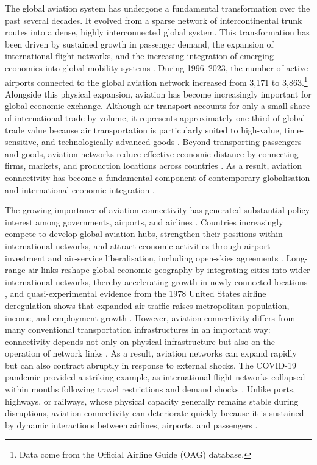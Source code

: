 The global aviation system has undergone a fundamental transformation over
the past several decades. It evolved from a sparse network of
intercontinental trunk routes into a dense, highly interconnected global
system. This transformation has been driven by sustained growth in passenger
demand, the expansion of international flight networks, and the increasing
integration of emerging economies into global mobility systems
\citep{Liao_2026,OKelly_2026}. During 1996--2023, the number of active
airports connected to the global aviation network increased from 3{,}171 to
3{,}863.\footnote{Data come from the Official Airline Guide (OAG) database.}
Alongside this physical expansion, aviation has become increasingly important
for global economic exchange. Although air transport accounts for only a
small share of international trade by volume, it represents approximately one
third of global trade value because air transportation is particularly suited
to high-value, time-sensitive, and technologically advanced goods
\citep{IATA_cargo}. Beyond transporting passengers and goods, aviation
networks reduce effective economic distance by connecting firms, markets, and
production locations across countries \citep{Lenaerts_2021}. As a result,
aviation connectivity has become a fundamental component of contemporary
globalisation and international economic integration \citep{Zhang_2026}.

The growing importance of aviation connectivity has generated substantial
policy interest among governments, airports, and airlines \citep{Adler_2014}.
Countries increasingly compete to develop global aviation hubs, strengthen
their positions within international networks, and attract economic
activities through airport investment and air-service liberalisation,
including open-skies agreements \citep{Gillen_2002,Burghouwt_2015}.
Long-range air links reshape global economic geography by integrating cities
into wider international networks, thereby accelerating growth in newly
connected locations \citep{Campante_2017}, and quasi-experimental evidence
from the 1978 United States airline deregulation shows that expanded air
traffic raises metropolitan population, income, and employment growth
\citep{Blonigen_2015}. However, aviation connectivity
differs from many conventional transportation infrastructures in an important
way: connectivity depends not only on physical infrastructure but also on the
operation of network links \citep{Wandelt_2025}. As a result, aviation
networks can expand rapidly but can also contract abruptly in response to
external shocks. The COVID-19 pandemic provided a striking example, as
international flight networks collapsed within months following travel
restrictions and demand shocks \citep{Sun_2021}. Unlike ports, highways, or
railways, whose physical capacity generally remains stable during
disruptions, aviation connectivity can deteriorate quickly because it is
sustained by dynamic interactions between airlines, airports, and passengers
\citep{Zhou_2021}.

